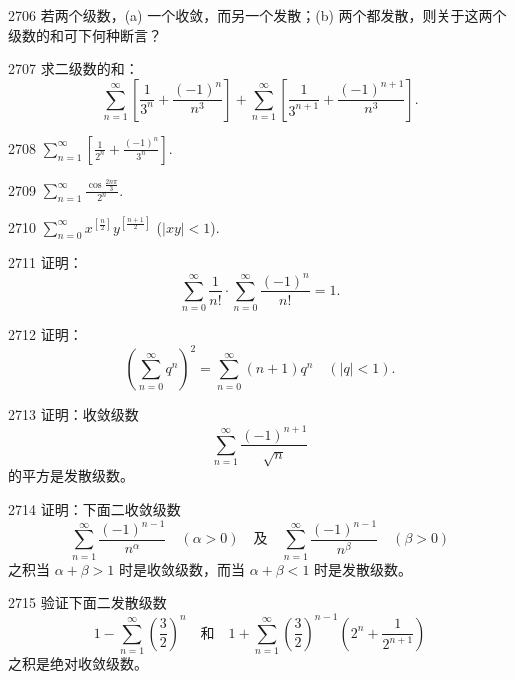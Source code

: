 
\begin{prob}[M]{2706}
若两个级数，(a) 一个收敛，而另一个发散；(b) 两个都发散，则关于这两个级数的和可下何种断言？
\end{prob}

\begin{prob}[M]{2707}
求二级数的和：
\[\sum_{n=1}^{\infty} \left[\frac{1}{3^n} + \frac{(-1)^n}{n^3}\right] + \sum_{n=1}^{\infty} \left[\frac{1}{3^{n+1}} + \frac{(-1)^{n+1}}{n^3}\right].\]
\end{prob}


\begin{prob}[S]{2708}
$\sum_{n=1}^{\infty} \left[\frac{1}{2^n} + \frac{(-1)^n}{3^n}\right]$.
\end{prob}

\begin{prob}[S]{2709}
$\sum_{n=1}^{\infty} \frac{\cos \frac{2n\pi}{3}}{2^n}$.
\end{prob}

\begin{prob}[S]{2710}
$\sum_{n=0}^{\infty} x^{\left[\frac{n}{2}\right]} y^{\left[\frac{n+1}{2}\right]}$ ($|xy| < 1$).
\end{prob}

\begin{prob}[M]{2711}
证明：
\[\sum_{n=0}^{\infty} \frac{1}{n!} \cdot \sum_{n=0}^{\infty} \frac{(-1)^n}{n!} = 1.\]
\end{prob}

\begin{prob}[M]{2712}
证明：
\[\left(\sum_{n=0}^{\infty} q^n\right)^2 = \sum_{n=0}^{\infty} (n+1) q^n \quad (|q| < 1).\]
\end{prob}

\begin{prob}[M]{2713}
证明：收敛级数
\[\sum_{n=1}^{\infty} \frac{(-1)^{n+1}}{\sqrt{n}}\]
的平方是发散级数。
\end{prob}

\begin{prob}[M]{2714}
证明：下面二收敛级数
\[\sum_{n=1}^{\infty} \frac{(-1)^{n-1}}{n^\alpha} \quad (\alpha > 0) \quad \text{及} \quad \sum_{n=1}^{\infty} \frac{(-1)^{n-1}}{n^\beta} \quad (\beta > 0)\]
之积当 $\alpha + \beta > 1$ 时是收敛级数，而当 $\alpha + \beta < 1$ 时是发散级数。
\end{prob}

\begin{prob}[M]{2715}
验证下面二发散级数
\[1 - \sum_{n=1}^{\infty} \left(\frac{3}{2}\right)^n \quad \text{和} \quad 1 + \sum_{n=1}^{\infty} \left(\frac{3}{2}\right)^{n-1} \left(2^n + \frac{1}{2^{n+1}}\right)\]
之积是绝对收敛级数。
\end{prob}

